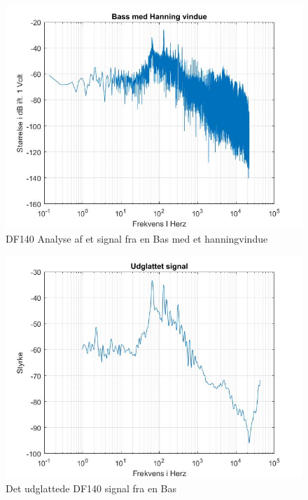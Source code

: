 \begin{figure}[H]
	\centering
	\includegraphics[width=140mm]{figures/Bass/hanning.jpg}
	\caption{DF140 Analyse af et signal fra en Bas med et hanningvindue}
	\label{fig:Bas hanning}
\end{figure}

\begin{figure}[H]
	\centering
	\includegraphics[width=140mm]{figures/Bass/udglattet.jpg}
	\caption{Det udglattede DF140 signal fra en Bas}
	\label{fig:Bas udglattet}
\end{figure}



